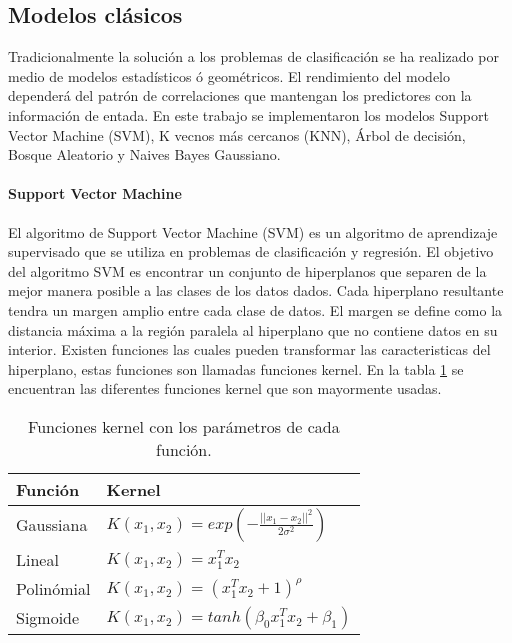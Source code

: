 \subsection{Modelos clásicos}

Tradicionalmente la solución a los problemas de clasificación se ha realizado por medio de modelos estadísticos ó geométricos. El rendimiento del modelo dependerá del patrón de correlaciones que mantengan los predictores con la información de entada. En este trabajo se implementaron los modelos Support Vector Machine (SVM), K vecnos más cercanos (KNN), Árbol de decisión, Bosque Aleatorio y Naives Bayes Gaussiano.

\paragraph{Support Vector Machine}

El algoritmo de Support Vector Machine (SVM) es un algoritmo de aprendizaje supervisado que se utiliza en problemas de clasificación y regresión. El objetivo del algoritmo SVM es encontrar un conjunto de hiperplanos que separen de la mejor manera posible a las clases de los datos dados. Cada hiperplano resultante tendra un margen amplio entre cada clase de datos. El margen se define como la distancia máxima a la región paralela al hiperplano que no contiene datos en su interior. Existen funciones las cuales pueden transformar las caracteristicas del hiperplano, estas funciones son llamadas funciones kernel. En la tabla \ref{table:kernels} se encuentran las diferentes funciones kernel que son mayormente usadas.

\begin{table}[H]
	\centering
	\begin{tabular}{ll} \hline
		\textbf{Función} & \textbf{Kernel}                                                  \\ \hline
		Gaussiana        & $K(x_1,x_2) = exp\left(-\frac{||x_1-x_2||^2}{2\sigma^2} \right)$ \\[0.1cm]
		Lineal           & $K(x_1,x_2)=x_1^Tx_2$                                            \\[0.1cm]
		Polinómial       & $K(x_1,x_2)= (x_1^Tx_2+1)^\rho $                                 \\[0.1cm]
		Sigmoide         & $K(x_1,x_2)=tanh(\beta_0 x_1^Tx_2+\beta_1)$                      \\ [0.1cm]\hline
	\end{tabular}
	\caption{Funciones kernel con los parámetros de cada función.}
	\label{table:kernels}
\end{table}

